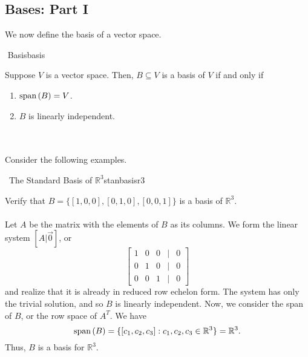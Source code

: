         \pagebreak

        \subsection{Bases: Part I}

            We now define the basis of a vector space.
            \begin{definition}{\Stop\,\,Basis}{basis}

                Suppose \(V\) is a vector space. Then, \(B\subseteq V\) is a basis of \(V\) if and only if
                \begin{enumerate}
                    \item \(\text{span\,}(B)=V\).
                    \item \(B\) is linearly independent.
                \end{enumerate}

            \end{definition}
            \vphantom
            \\
            \\
            Consider the following examples.
            \begin{example}{\Difficulty\,\Difficulty\,\,The Standard Basis of \(\mathbb{R}^3\)}{stanbasisr3}

                Verify that \(B=\{[1,0,0],[0,1,0],[0,0,1]\}\) is a basis of \(\mathbb{R}^3\).
                \\
                \\
                Let \(A\) be the matrix with the elements of \(B\) as its columns. We form the linear system \([A|\vec{0}]\), or
                \begin{equation*}
                    \begin{bmatrix}
                        1 & 0 & 0 & | & 0 \\
                        0 & 1 & 0 & | & 0 \\
                        0 & 0 & 1 & | & 0
                    \end{bmatrix}
                \end{equation*}
                and realize that it is already in reduced row echelon form. The system has only the trivial solution, and so \(B\) is linearly independent. Now, we consider the span of \(B\), or the row space of \(A^T\). We have
                \begin{equation*}
                    \text{span\,}(B)=\{[c_1,c_2,c_3]:c_1,c_2,c_3\in\mathbb{R}^3\}=\mathbb{R}^3.
                \end{equation*}
                Thus, \(B\) is a basis for \(\mathbb{R}^3\).
                
            \end{example}
